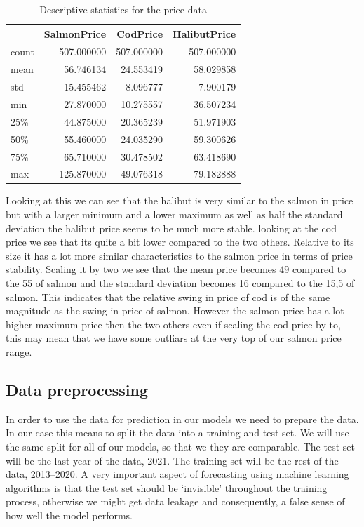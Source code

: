 \begin{table}[H]
    \begin{center}
    \begin{tabular}{lrrr}
        \toprule
        {} &  SalmonPrice &    CodPrice &  HalibutPrice \\
        \midrule
        count &   507.000000 &  507.000000 &    507.000000 \\
        mean  &    56.746134 &   24.553419 &     58.029858 \\
        std   &    15.455462 &    8.096777 &      7.900179 \\
        min   &    27.870000 &   10.275557 &     36.507234 \\
        25\%   &    44.875000 &   20.365239 &     51.971903 \\
        50\%   &    55.460000 &   24.035290 &     59.300626 \\
        75\%   &    65.710000 &   30.478502 &     63.418690 \\
        max   &   125.870000 &   49.076318 &     79.182888 \\
        \bottomrule
    \end{tabular}
    \end{center}
    \caption{Descriptive statistics for the price data}
\end{table}

Looking at this we can see that the halibut is very similar to the salmon in price but with a larger minimum and a lower maximum as well as half the standard deviation the halibut price seems to be much more stable. looking at the cod price we see that its quite a bit lower compared to the two others. Relative to its size it has a lot more similar characteristics to the salmon price in terms of price stability. Scaling it by two we see that the mean price becomes 49 compared to the 55 of salmon and the standard deviation becomes 16 compared to the 15,5 of salmon. This indicates that the relative swing in price of cod is of the same magnitude as the swing in price of salmon. However the salmon price has a lot higher maximum price then the two others even if scaling the cod price by to, this may mean that we have some outliars at the very top of our salmon price range.



\subsection{Data preprocessing}
In order to use the data for prediction in our models we need to prepare the data. In our case this means to split the data into a training and test set. We will use the same split for all of our models, so that we they are comparable. The test set will be the last year of the data, 2021. The training set will be the rest of the data, 2013--2020. A very important aspect of forecasting using machine learning algorithms is that the test set should be `invisible' throughout the training process, otherwise we might get data leakage and consequently, a false sense of how well the model performs.~\parencite{brownlee_2016}
